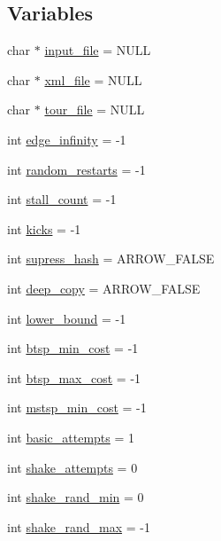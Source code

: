 \subsection*{Variables}
\begin{CompactItemize}
\item 
char $\ast$ \hyperlink{bin_2baltsp-db_8c_a4f3a15de34c409bdec6ceacf93078ed}{input\_\-file} = NULL
\item 
char $\ast$ \hyperlink{bin_2baltsp-db_8c_bf4e392494984c6ef8259268eb1fe421}{xml\_\-file} = NULL
\item 
char $\ast$ \hyperlink{bin_2baltsp-db_8c_b818a82f867be75d7c4d92d792b0943e}{tour\_\-file} = NULL
\item 
int \hyperlink{bin_2baltsp-db_8c_61a12d5995172f376610cce2f19e5855}{edge\_\-infinity} = -1
\item 
int \hyperlink{bin_2baltsp-db_8c_e6a9db0fe5c8a0407d62dec2f7a14959}{random\_\-restarts} = -1
\item 
int \hyperlink{bin_2baltsp-db_8c_a1641a28cf3ea572a56763e84518c17b}{stall\_\-count} = -1
\item 
int \hyperlink{bin_2baltsp-db_8c_b8f057ba1ad6b7f0c46f8140b25b3467}{kicks} = -1
\item 
int \hyperlink{bin_2baltsp-db_8c_c022145e682345ed4064bad274e5a4f1}{supress\_\-hash} = ARROW\_\-FALSE
\item 
int \hyperlink{bin_2baltsp-db_8c_7298da576a5b127d04b4c46b3bc78821}{deep\_\-copy} = ARROW\_\-FALSE
\item 
int \hyperlink{bin_2baltsp-db_8c_ed7394fd8e0c2796b26b9654fd10fd9d}{lower\_\-bound} = -1
\item 
int \hyperlink{bin_2baltsp-db_8c_97987334c96a847ff74c2c6c83d78a73}{btsp\_\-min\_\-cost} = -1
\item 
int \hyperlink{bin_2baltsp-db_8c_8135b6557d64f65441d8f07fdc21ffdc}{btsp\_\-max\_\-cost} = -1
\item 
int \hyperlink{bin_2baltsp-db_8c_79e1b33b7d744b8baacfe9c0b2e73013}{mstsp\_\-min\_\-cost} = -1
\item 
int \hyperlink{bin_2baltsp-db_8c_227b7ec968925f365b96a92ace419c56}{basic\_\-attempts} = 1
\item 
int \hyperlink{bin_2baltsp-db_8c_a4451667ac0b07bcf8396ecdb8c90f6e}{shake\_\-attempts} = 0
\item 
int \hyperlink{bin_2baltsp-db_8c_b7fc57ece1162e77f74b4803961b72cb}{shake\_\-rand\_\-min} = 0
\item 
int \hyperlink{bin_2baltsp-db_8c_bcacd5fab89a9f3eaab5401c5001b4c5}{shake\_\-rand\_\-max} = -1

\end{CompactItemize}
